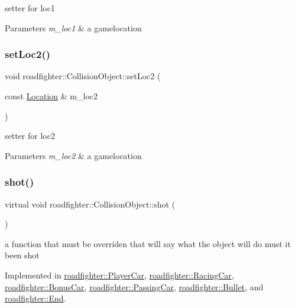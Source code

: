setter for loc1 
\begin{DoxyParams}{Parameters}
{\em m\+\_\+loc1} & a gamelocation \\
\hline
\end{DoxyParams}
\mbox{\label{classroadfighter_1_1CollisionObject_a8f566d1ea28f2ed16723572617abd583}} 
\subsubsection{\texorpdfstring{set\+Loc2()}{setLoc2()}}
{\footnotesize\ttfamily void roadfighter\+::\+Collision\+Object\+::set\+Loc2 (\begin{DoxyParamCaption}\item[{const \hyperlink{classroadfighter_1_1Location}{Location} \&}]{m\+\_\+loc2 }\end{DoxyParamCaption})}

setter for loc2 
\begin{DoxyParams}{Parameters}
{\em m\+\_\+loc2} & a gamelocation \\
\hline
\end{DoxyParams}
\mbox{\label{classroadfighter_1_1CollisionObject_a338a1071e6d5e25439e57c8673308dbb}} 
\subsubsection{\texorpdfstring{shot()}{shot()}}
{\footnotesize\ttfamily virtual void roadfighter\+::\+Collision\+Object\+::shot (\begin{DoxyParamCaption}{ }\end{DoxyParamCaption})\hspace{0.3cm}{\ttfamily [pure virtual]}}

a function that must be overriden that will say what the object will do must it been shot 

Implemented in \hyperlink{classroadfighter_1_1PlayerCar_a592556a1c6326c9d9a70691f036eaafc}{roadfighter\+::\+Player\+Car}, \hyperlink{classroadfighter_1_1RacingCar_a20c4363a1d31cc17d7d82c8f9a219d2d}{roadfighter\+::\+Racing\+Car}, \hyperlink{classroadfighter_1_1BonusCar_a02edcd22a86c1f98642c3703ef8dfb16}{roadfighter\+::\+Bonus\+Car}, \hyperlink{classroadfighter_1_1PassingCar_ac04b801b789bf880011d5cdb1ffdec59}{roadfighter\+::\+Passing\+Car}, \hyperlink{classroadfighter_1_1Bullet_acaacd303f1f4e55c5029d4a4cbe1d9b1}{roadfighter\+::\+Bullet}, and \hyperlink{classroadfighter_1_1End_af81f5e854c8504a60afa11ea826aaec8}{roadfighter\+::\+End}.

